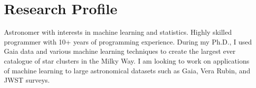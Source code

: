\section*{Research Profile}

Astronomer with interests in machine learning and statistics. Highly skilled programmer with 10+ years of programming experience. During my Ph.D., I used Gaia data and various machine learning techniques to create the largest ever catalogue of star clusters in the Milky Way. I am looking to work on applications of machine learning to large astronomical datasets such as Gaia, Vera Rubin, and JWST surveys.